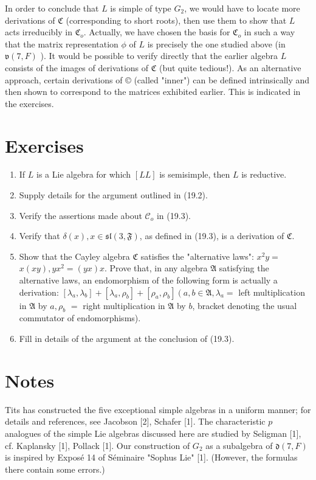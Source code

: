 \documentclass[10pt]{article}
\begin{document}
In order to conclude that $L$ is simple of type $G_{2}$, we would have to locate more derivations of $\mathfrak{C}$ (corresponding to short roots), then use them to show that $L$ acts irreducibly in $\mathfrak{C}_{o}$. Actually, we have chosen the basis for $\mathfrak{C}_{o}$ in such a way that the matrix representation $\phi$ of $L$ is precisely the one studied above (in $\mathfrak{v}(7, F)$ ). It would be possible to verify directly that the earlier algebra $L$ consists of the images of derivations of $\mathfrak{C}$ (but quite tedious!). As an alternative approach, certain derivations of © (called "inner") can be defined intrinsically and then shown to correspond to the matrices exhibited earlier. This is indicated in the exercises.

\section*{Exercises}
\begin{enumerate}
  \item If $L$ is a Lie algebra for which $[L L]$ is semisimple, then $L$ is reductive.
  \item Supply details for the argument outlined in (19.2).
  \item Verify the assertions made about $\mathcal{C}_{o}$ in (19.3).
  \item Verify that $\delta(x), x \in \mathfrak{s l}(3, \mathfrak{F})$, as defined in (19.3), is a derivation of $\mathfrak{C}$.
  \item Show that the Cayley algebra $\mathfrak{C}$ satisfies the "alternative laws": $x^{2} y=$ $x(x y), y x^{2}=(y x) x$. Prove that, in any algebra $\mathfrak{A}$ satisfying the alternative laws, an endomorphism of the following form is actually a derivation: $\left[\lambda_{a}, \lambda_{b}\right]+\left[\lambda_{a}, \rho_{b}\right]+\left[\rho_{a}, \rho_{b}\right]\left(a, b \in \mathfrak{A}, \lambda_{a}=\right.$ left multiplication in $\mathfrak{A}$ by $a, \rho_{b}$ $=$ right multiplication in $\mathfrak{A}$ by $b$, bracket denoting the usual commutator of endomorphisms).
  \item Fill in details of the argument at the conclusion of (19.3).
\end{enumerate}

\section*{Notes}
Tits has constructed the five exceptional simple algebras in a uniform manner; for details and references, see Jacobson [2], Schafer [1]. The characteristic $p$ analogues of the simple Lie algebras discussed here are studied by Seligman [1], cf. Kaplansky [1], Pollack [1]. Our construction of $G_{2}$ as a subalgebra of $\mathfrak{d}(7, F)$ is inspired by Exposé 14 of Séminaire "Sophus Lie" [1]. (However, the formulas there contain some errors.)
\end{document}
